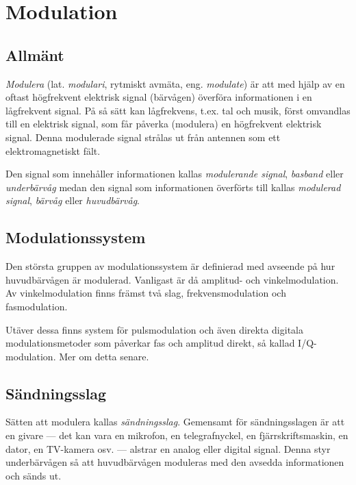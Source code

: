 \section{Modulation}
\label{modulation}

\subsection{Allmänt}

\emph{Modulera} (lat. \emph{modulari}, rytmiskt avmäta, eng. \emph{modulate})
är att med hjälp av en oftast högfrekvent elektrisk signal (bärvågen) överföra
informationen i en lågfrekvent signal.
På så sätt kan lågfrekvens, t.ex. tal och musik, först omvandlas till en
elektrisk signal, som får påverka (modulera) en högfrekvent elektrisk signal.
Denna modulerade signal strålas ut från antennen som ett elektromagnetiskt fält.

Den signal som innehåller informationen kallas \emph{modulerande signal},
\emph{basband} eller \emph{underbärvåg} medan den signal som informationen överförts till kallas \emph{modulerad signal}, \emph{bärvåg} eller \emph{huvudbärvåg}.

\subsection{Modulationssystem}

Den största gruppen av modulationssystem är definierad med avseende på hur
huvudbärvågen är modulerad.
Vanligast är då amplitud- och vinkelmodulation.
Av vinkelmodulation finns främst två slag, frekvensmodulation och fasmodulation.

Utäver dessa finns system för pulsmodulation och även direkta digitala modulationsmetoder som påverkar fas och amplitud direkt, så kallad I/Q-modulation. Mer om detta senare.

\subsection{Sändningsslag}

Sätten att modulera kallas \emph{sändningsslag}.
Gemensamt för sändningsslagen är att en givare --- det kan vara en mikrofon, en
telegrafnyckel, en fjärrskriftsmaskin, en dator, en TV-kamera osv. --- alstrar
en analog eller digital signal.
Denna styr underbärvågen så att huvudbärvågen moduleras med den avsedda
informationen och sänds ut.

